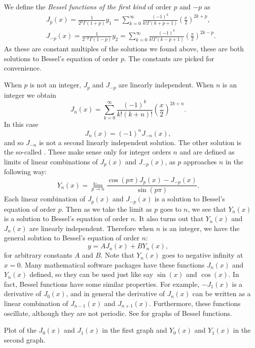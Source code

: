We define the \emph{Bessel functions of the first kind}%
 of
order $p$ and $-p$ as
\begin{align*}
& J_p(x) = \frac{1}{2^p\Gamma(1+p)} y_1
=
\sum_{k=0}^\infty
\frac{{(-1)}^k}{k! \Gamma(k+p+1)}
{\left(\frac{x}{2}\right)}^{2k+p} ,
\\
& J_{-p}(x) = \frac{1}{2^{-p}\Gamma(1-p)} y_2
=
\sum_{k=0}^\infty
\frac{{(-1)}^k}{k! \Gamma(k-p+1)}
{\left(\frac{x}{2}\right)}^{2k-p} .
\end{align*}
As these are constant multiples of the solutions we found above, these are
both solutions to Bessel's equation of order $p$.  The constants are picked
for convenience.

When $p$ is not an integer, $J_p$
and $J_{-p}$ are linearly independent.  When $n$ is an integer we 
obtain
\begin{equation*}
J_n(x) =
\sum_{k=0}^\infty
\frac{{(-1)}^k}{k! (k+n)!}
{\left(\frac{x}{2}\right)}^{2k+n} .
\end{equation*}
In this case
\begin{equation*}
J_n(x) = {(-1)}^nJ_{-n}(x) ,
\end{equation*}
and so $J_{-n}$ is not a second linearly independent
solution.  The other solution is the
so-called \emph{}.  These make
sense only for integer orders $n$ and
are defined as limits of linear combinations of $J_p(x)$ and $J_{-p}(x)$, as
$p$ approaches $n$ in the
following way:
\begin{equation*}
Y_n(x) = \lim_{p\to n} \frac{\cos(p \pi) J_p(x) - J_{-p}(x)}{\sin(p \pi)} .
\end{equation*}
Each linear combination of $J_p(x)$ and $J_{-p}(x)$ is a solution
to Bessel's equation of order $p$.  Then as we take the limit as $p$
goes to $n$, we see that $Y_n(x)$ is a solution to Bessel's equation of
order $n$.  It also turns out that $Y_n(x)$ and $J_n(x)$ are linearly
independent.  Therefore when $n$ is an integer, we have the
general solution to Bessel's equation of order $n$:
\begin{equation*}
y = A J_n(x) + B Y_n(x) ,
\end{equation*}
for arbitrary constants $A$ and $B$.  Note that
$Y_n(x)$ goes to negative infinity at $x=0$.   Many mathematical software
packages have
these functions $J_n(x)$ and $Y_n(x)$ defined, so they can be used
just like say $\sin(x)$ and $\cos(x)$.  In fact, Bessel functions
have some similar 
properties.  For example, $-J_1(x)$ is a derivative of $J_0(x)$, and
in general the derivative of $J_n(x)$ can be written as a linear
combination of $J_{n-1}(x)$ and $J_{n+1}(x)$.  Furthermore, these
functions oscillate, although they are not periodic.  See
 for graphs of Bessel functions.
\begin{myfig}
\capstart
\caption{Plot of the $J_0(x)$ and $J_1(x)$ in the first graph
and $Y_0(x)$ and $Y_1(x)$ in the second graph.\label{bessel:graphsfig}}
\end{myfig}

